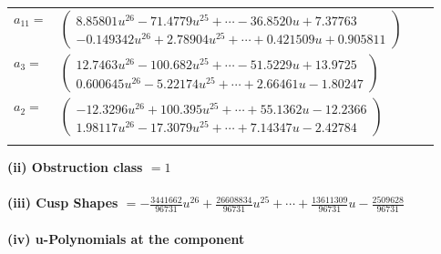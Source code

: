 \documentclass[1p]{elsarticle_modified}
\theoremstyle{definition}
\begin{document}
\begin{tabular}{m{7pt} m{180pt} m{7pt} m{180pt} }
\flushright $a_{11}=$&$\begin{pmatrix}8.85801 u^{26}-71.4779 u^{25}+\cdots-36.8520 u+7.37763\\-0.149342 u^{26}+2.78904 u^{25}+\cdots+0.421509 u+0.905811\end{pmatrix}$ \\
\flushright $a_{3}=$&$\begin{pmatrix}12.7463 u^{26}-100.682 u^{25}+\cdots-51.5229 u+13.9725\\0.600645 u^{26}-5.22174 u^{25}+\cdots+2.66461 u-1.80247\end{pmatrix}$ \\
\flushright $a_{2}=$&$\begin{pmatrix}-12.3296 u^{26}+100.395 u^{25}+\cdots+55.1362 u-12.2366\\1.98117 u^{26}-17.3079 u^{25}+\cdots+7.14347 u-2.42784\end{pmatrix}$\\&\end{tabular}
\flushleft \textbf{(ii) Obstruction class $= 1$}\\~\\
\flushleft \textbf{(iii) Cusp Shapes $= -\frac{3441662}{96731} u^{26}+\frac{26608834}{96731} u^{25}+\cdots+\frac{13611309}{96731} u-\frac{2509628}{96731}$}\\~\\
\newpage\renewcommand{\arraystretch}{1}
\flushleft \textbf{(iv) u-Polynomials at the component}\newline \\
\end{document}
